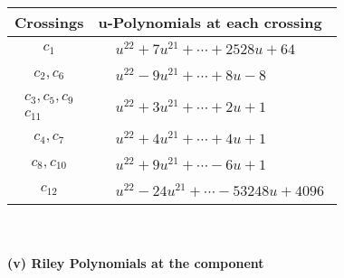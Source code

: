 \documentclass[1p]{elsarticle_modified}
\theoremstyle{definition}
\begin{document}
\begin{tabular}{m{50pt}|m{274pt}}
Crossings & \hspace{64pt}u-Polynomials at each crossing \\
\hline $$\begin{aligned}c_{1}\end{aligned}$$&$\begin{aligned}
&u^{22}+7 u^{21}+\cdots+2528 u+64
\end{aligned}$\\
\hline $$\begin{aligned}c_{2},c_{6}\end{aligned}$$&$\begin{aligned}
&u^{22}-9 u^{21}+\cdots+8 u-8
\end{aligned}$\\
\hline $$\begin{aligned}c_{3},c_{5},c_{9}\\c_{11}\end{aligned}$$&$\begin{aligned}
&u^{22}+3 u^{21}+\cdots+2 u+1
\end{aligned}$\\
\hline $$\begin{aligned}c_{4},c_{7}\end{aligned}$$&$\begin{aligned}
&u^{22}+4 u^{21}+\cdots+4 u+1
\end{aligned}$\\
\hline $$\begin{aligned}c_{8},c_{10}\end{aligned}$$&$\begin{aligned}
&u^{22}+9 u^{21}+\cdots-6 u+1
\end{aligned}$\\
\hline $$\begin{aligned}c_{12}\end{aligned}$$&$\begin{aligned}
&u^{22}-24 u^{21}+\cdots-53248 u+4096
\end{aligned}$\\
\hline
\end{tabular}\\~\\
\newpage\renewcommand{\arraystretch}{1}
\flushleft \textbf{(v) Riley Polynomials at the component}\newline \\
\end{document}
